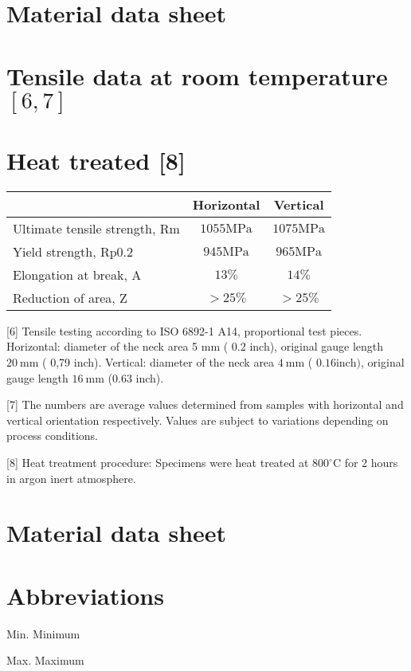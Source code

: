\documentclass[10pt]{article}
\begin{document}
\section*{Material data sheet}
\section*{Tensile data at room temperature $[6,7]$}
\section*{Heat treated [8]}
\begin{center}
\begin{tabular}{lcc}
\hline
 & Horizontal & Vertical \\
\hline
Ultimate tensile strength, Rm & $1055 \mathrm{MPa}$ & $1075 \mathrm{MPa}$ \\
\hline
Yield strength, Rp0.2 & $945 \mathrm{MPa}$ & $965 \mathrm{MPa}$ \\
\hline
Elongation at break, A & $13 \%$ & $14 \%$ \\
\hline
Reduction of area, Z & $>25 \%$ & $>25 \%$ \\
\hline
\end{tabular}
\end{center}

[6] Tensile testing according to ISO 6892-1 A14, proportional test pieces. Horizontal: diameter of the neck area 5 $\mathrm{mm}$ ( 0.2 inch), original gauge length $20 \mathrm{~mm}$ ( 0,79 inch). Vertical: diameter of the neck area $4 \mathrm{~mm}$ ( $0.16 \mathrm{inch})$, original gauge length $16 \mathrm{~mm}$ (0.63 inch).

[7] The numbers are average values determined from samples with horizontal and vertical orientation respectively. Values are subject to variations depending on process conditions.

[8] Heat treatment procedure: Specimens were heat treated at $800^{\circ} \mathrm{C}$ for 2 hours in argon inert atmosphere.

\section*{Material data sheet}
\section*{Abbreviations}
Min. Minimum

Max. Maximum
\end{document}
